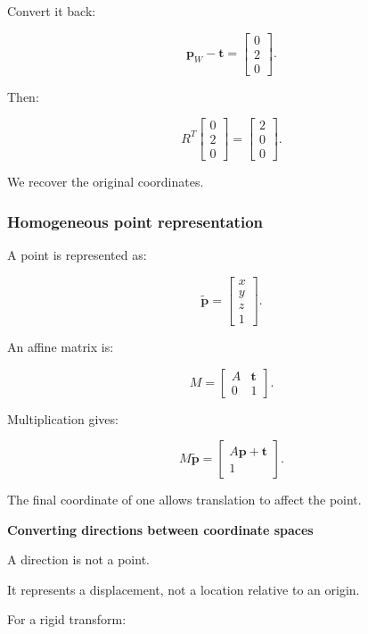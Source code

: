 Convert it back:

\[
 \mathbf p_W-\mathbf t= \begin{bmatrix}0\\2\\0\end{bmatrix}.
\]

Then:

\[
 R^T \begin{bmatrix}0\\2\\0\end{bmatrix} = \begin{bmatrix}2\\0\\0\end{bmatrix}.
\]

We recover the original coordinates.

\subsubsection{Homogeneous point representation}\label{homogeneous-point-representation}

A point is represented as:

\[
 \boxed{ \tilde{\mathbf p}= \begin{bmatrix}x\\y\\z\\1\end{bmatrix} }.
\]

An affine matrix is:

\[
 M= \begin{bmatrix} A&\mathbf t\\ 0&1 \end{bmatrix}.
\]

Multiplication gives:

\[
 M\tilde{\mathbf p}= \begin{bmatrix} A\mathbf p+\mathbf t\\1 \end{bmatrix}.
\]

The final coordinate of one allows translation to affect the point.

\textbf{Converting directions between coordinate spaces}

A direction is not a point.

It represents a displacement, not a location relative to an origin.

For a rigid transform:

